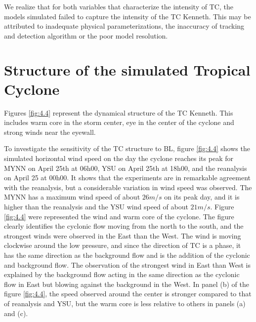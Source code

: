 \documentclass[8pt,a4paper]{article}
\begin{document}
	We realize that for both variables that characterize the intensity of TC, the models simulated failed to capture the intensity of the TC Kenneth. This may be attributed to inadequate physical parameterizations, the inaccuracy of tracking and detection algorithm or the poor model resolution.
	
	

	\section{Structure of the simulated Tropical Cyclone}
	
	Figures \ref{fig:4.4}  represent the dynamical structure of the TC Kenneth. This includes warm core in the storm center, eye in the center of the cyclone and strong winds near the eyewall.
	
	To investigate the sensitivity of the TC structure to BL, figure \ref{fig:4.4} shows the simulated horizontal wind speed on the day the cyclone reaches its peak for MYNN on April 25th at 06h00, YSU on April 25th at 18h00, and the reanalysis on April 25 at 00h00. It shows that the experiments are in remarkable agreement with the reanalysis, but a considerable variation in wind speed was observed. The MYNN has a maximum wind speed of about $26 m/s$ on its peak day, and it is higher than the reanalysis and the YSU wind speed of about $21 m/s$. Figure \ref{fig:4.4} were represented the wind and warm core of the cyclone. The figure clearly identifies the cyclonic flow moving from the north to the south, and the strongest winds were observed in the East than the West. The wind is moving clockwise around the low pressure, and since the direction of TC is a phase, it has the same direction as the background flow and is the addition of the cyclonic and background flow. The observation of the strongest wind in East than West is explained by the background flow acting in the same direction as the cyclonic flow in East but blowing against the background in the West. In panel (b) of the figure \ref{fig:4.4}, the speed observed around the center is stronger compared to that of reanalysis and YSU, but the warm core is less relative to others in panels (a) and (c).
	
\end{document}
